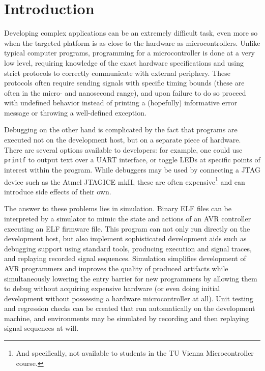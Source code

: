 
\chapter{Introduction} \label{chapter:introduction}

Developing complex applications can be an extremely difficult task, even more so when
the targeted platform is as close to the hardware as microcontrollers. Unlike
typical computer programs, programming for a microcontroller is done at a very low level,
requiring knowledge of the exact hardware specifications and using strict protocols
to correctly communicate with external periphery. These protocols often require
sending signals with specific timing bounds (these are often in the micro- and nanosecond
range), and upon failure to do so proceed with undefined behavior instead of
printing a (hopefully) informative error message or throwing a well-defined
exception.

Debugging on the other hand is complicated by the fact that programs are executed
not on the development host, but on a separate piece of hardware.
There are several options available to developers: for example, one could
use \lstinline|printf| to output text
over a \ac{UART} interface, or toggle \acp{LED} at specific points of interest
within the program.
While debuggers may be used by connecting a \ac{JTAG} device such as the Atmel
JTAGICE mkII,
these are often expensive\footnote{
%
And specifically, not available to students in the \ac{TU} Vienna Microcontroller course.
%
} and can introduce side effects of their own.

The answer to these problems lies in simulation. Binary \ac{ELF} files can be
interpreted by a simulator to mimic the state and actions of an \ac{AVR} controller
executing an \ac{ELF} firmware file. This program can not only run directly on the development
host, but also implement sophisticated development aids such as debugging support
using standard tools, producing execution and signal traces, and replaying recorded
signal sequences. Simulation simplifies development of \ac{AVR} programmers and improves
the quality of produced artifacts while simultaneously lowering the entry barrier
for new programmers by allowing them to debug without acquiring expensive
hardware (or even doing initial development without possessing a hardware microcontroller
at all). Unit testing and regression checks can be created that run automatically
on the development machine, and environments may be simulated by recording and then
replaying signal sequences at will.

